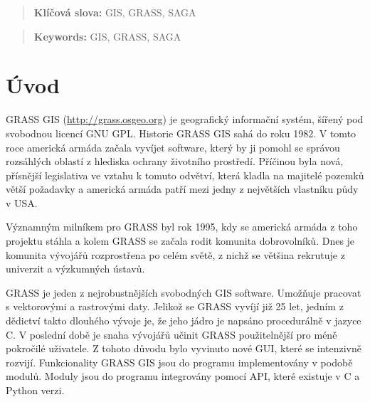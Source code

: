 \documentclass[a4paper,12pt]{article}
\author{Štěpán Turek}
\newcommand{\klicslova}[2]{\noindent\textbf{#1: }#2}
\newcommand{\necislovana}[1]{%
\phantomsection
\addcontentsline{toc}{section}{#1}
\section*{#1}
\markboth{\uppercase{#1}}{}
}
\begin{document}
\pagestyle{empty}


\newpage





\begin{abstract}

\bigskip

\klicslova{Klíčová slova}{GIS, GRASS, SAGA}

\end{abstract}

\begin{abstract}

\bigskip

\klicslova{Keywords}{GIS, GRASS, SAGA}

\end{abstract}


\newpage

\newpage
\tableofcontents


\newpage
\pagestyle{fancy}

\necislovana{Úvod}



GRASS GIS (\url{http://grass.osgeo.org}) je geografický informační systém, šířený  pod svobodnou licencí GNU GPL.  
Historie GRASS GIS sahá do roku 1982. V tomto roce americká armáda začala vyvíjet software, který by ji pomohl se správou rozsáhlých oblastí z hlediska ochrany 
životního prostředí. Příčinou byla nová, přísnější legislativa ve vztahu k tomuto odvětví, která kladla na majitelé pozemků větší požadavky a americká armáda patří mezi jedny z největších vlastníku půdy v USA.
 
Významným milníkem pro GRASS byl rok 1995, kdy se americká armáda z toho projektu stáhla a kolem GRASS se začala rodit komunita dobrovolníků. 
Dnes je komunita vývojářů rozprostřena po celém světě, z nichž se většina rekrutuje z univerzit a výzkumných ústavů. 

GRASS je jeden z nejrobustnějších svobodných GIS software. Umožňuje pracovat s vektorovými a rastrovými daty.
Jelikož se GRASS vyvíjí již 25 let, jedním z dědictví takto dlouhého vývoje je, že jeho jádro je napsáno procedurálně v jazyce C. 
V poslední době je snaha vývojářů učinit GRASS použitelnější pro méně pokročilé uživatele. Z tohoto důvodu bylo vyvinuto nové GUI, které se intenzivně rozvijí. 
Funkcionality GRASS GIS jsou do programu implementovány v podobě modulů. Moduly jsou do programu integrovány pomocí API, které existuje v C a Python verzi.
\end{document}
